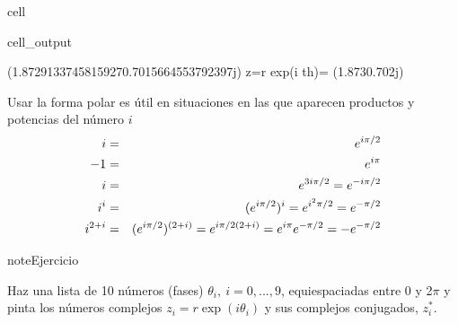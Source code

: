 \documentclass[letterpaper,10pt,english]{jupyterBook}
\begin{document}
\begin{sphinxuseclass}{cell}
\begin{sphinxVerbatimOutput}
\begin{sphinxuseclass}{cell_output}
\begin{sphinxVerbatim}[commandchars=\\\{\}]
(\PYGZhy{}1.8729133745815927\PYGZhy{}0.7015664553792397j)
z=r exp(i th)= (\PYGZhy{}1.873\PYGZhy{}0.702j)
\end{sphinxVerbatim}

\noindent{}

\end{sphinxuseclass}\end{sphinxVerbatimOutput}

\end{sphinxuseclass}
\sphinxAtStartPar
Usar la forma polar es útil en situaciones en las que aparecen productos y potencias del número \(i\)
\label{equation:docs/Part_01_Formalismo/Chapter_01_02_Formalismo_matemático/01_01_Numeros_Complejos_myst:84a1211f-117f-444c-a7ff-2be014e4697e}\begin{eqnarray}
i &=& e^{i\pi/2} \\ \rule{0mm}{10mm}
-1 &=& e^{i\pi} \\ \rule{0mm}{10mm}
i &=& e^{3i\pi/2} =e^{-i\pi/2} \\  \rule{0mm}{10mm}
i^i &=& (e^{i\pi/2})^i = e^{i^2 \pi/2} = e^{-\pi/2}  \\  \rule{0mm}{10mm}
i^{2+i} &=& (e^{i\pi/2})^{(2+i)}= e^{i\pi/2(2+i)} = e^{i\pi} e^{-\pi/2} = -e^{-\pi/2}  \rule{0mm}{10mm}
\end{eqnarray}
\begin{sphinxadmonition}{note}{Ejercicio}

\sphinxAtStartPar
Haz una lista de 10 números (fases) \(\theta_i, ~i=0,...,9\), equi\sphinxhyphen{}espaciadas entre 0 y 2\(\pi\) y pinta los números complejos \(z_i = r \exp(i \theta_i)\) y sus complejos conjugados, \(z^*_i\).
\end{sphinxadmonition}
\end{document}

